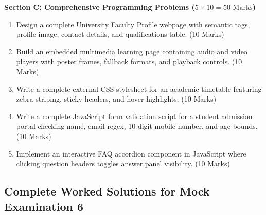 \begin{mockexam}
\medskip
\noindent\textbf{Section C: Comprehensive Programming Problems ($5 \times 10 = 50\text{ Marks}$)}
\begin{enumerate}[leftmargin=1.5em, start=17]
    \item Design a complete University Faculty Profile webpage with semantic tags, profile image, contact details, and qualifications table. (10 Marks)
    \item Build an embedded multimedia learning page containing audio and video players with poster frames, fallback formats, and playback controls. (10 Marks)
    \item Write a complete external CSS stylesheet for an academic timetable featuring zebra striping, sticky headers, and hover highlights. (10 Marks)
    \item Write a complete JavaScript form validation script for a student admission portal checking name, email regex, 10-digit mobile number, and age bounds. (10 Marks)
    \item Implement an interactive FAQ accordion component in JavaScript where clicking question headers toggles answer panel visibility. (10 Marks)
\end{enumerate}
\end{mockexam}

\subsection{Complete Worked Solutions for Mock Examination 6}

